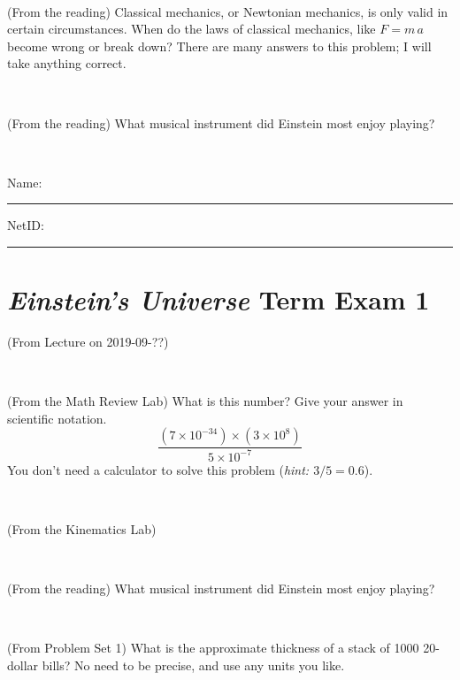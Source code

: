 \documentclass[12pt, letterpaper]{article}
\begin{document}
\vfill ~

\begin{problem} (From the reading)
Classical mechanics, or Newtonian mechanics, is only valid in certain
circumstances. When do the laws of classical mechanics, like $F =
m\,a$ become wrong or break down? There are many answers to this
problem; I will take anything correct.
\end{problem}


\vfill ~

\begin{problem} (From the reading)
What musical instrument did Einstein most enjoy playing?
\end{problem}


\vfill ~


\cleardoublepage



\noindent
Name: \rule[-1ex]{0.60\textwidth}{0.1pt}
NetID: \rule[-1ex]{0.20\textwidth}{0.1pt}

\section*{\textsl{Einstein's Universe} Term Exam 1}
\setcounter{problem}{1}


\begin{problem} (From Lecture on 2019-09-??)
\end{problem}


\vfill ~

\begin{problem} (From the Math Review Lab)
What is this number? Give your answer in scientific notation.
$$
\frac{(7\times10^{-34})\times(3\times10^8)}{5\times10^{-7}}
$$
You don't need a calculator to solve this problem (\textit{hint: $3/5=0.6$}).
\end{problem}


\vfill ~

\begin{problem} (From the Kinematics Lab)

\end{problem}


\vfill ~

\begin{problem} (From the reading)
What musical instrument did Einstein most enjoy playing?
\end{problem}


\vfill ~


\clearpage


\begin{problem} (From Problem Set 1)
What is the approximate thickness of a stack of 1000 20-dollar bills?
No need to be precise, and use any units you like.
\end{problem}
\end{document}
